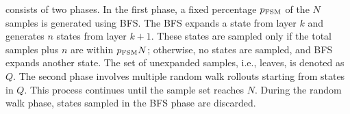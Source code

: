 \documentclass[ppgc,diss,english]{iiufrgs}
\begin{document}
\bfsrw consists of two phases. In the first phase, a fixed percentage $p_\text{FSM}$ of the $N$ samples is generated using BFS. The BFS expands a state from layer $k$ and generates $n$ states from layer $k+1$. These states are sampled only if the total samples plus $n$ are within $p_{\text{FSM}}N$; otherwise, no states are sampled, and BFS expands another state. The set of unexpanded samples, i.e., leaves, is denoted as $Q$. The second phase involves multiple random walk rollouts starting from states in $Q$. This process continues until the sample set reaches $N$. During the random walk phase, states sampled in the BFS phase are discarded.

%

\end{document}
